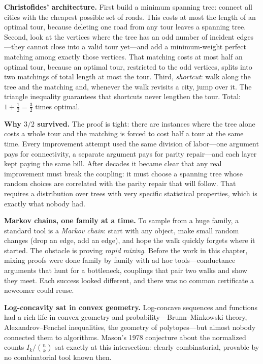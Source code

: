 \noindent\textbf{Christofides' architecture.} First build a minimum spanning tree: connect all cities with the cheapest possible set of roads. This costs at most the length of an optimal tour, because deleting one road from any tour leaves a spanning tree. Second, look at the vertices where the tree has an odd number of incident edges---they cannot close into a valid tour yet---and add a minimum-weight perfect matching among exactly those vertices. That matching costs at most half an optimal tour, because an optimal tour, restricted to the odd vertices, splits into two matchings of total length at most the tour. Third, \emph{shortcut}: walk along the tree and the matching and, whenever the walk revisits a city, jump over it. The triangle inequality guarantees that shortcuts never lengthen the tour. Total: $1+\tfrac12=\tfrac32$ times optimal.

\noindent\textbf{Why $3/2$ survived.} The proof is tight: there are instances where the tree alone costs a whole tour and the matching is forced to cost half a tour at the same time. Every improvement attempt used the same division of labor---one argument pays for connectivity, a separate argument pays for parity repair---and each layer kept paying the same bill. After decades it became clear that any real improvement must break the coupling: it must choose a spanning tree whose random choices are correlated with the parity repair that will follow. That requires a distribution over trees with very specific statistical properties, which is exactly what nobody had.

\noindent\textbf{Markov chains, one family at a time.} To sample from a huge family, a standard tool is a \emph{Markov chain}: start with any object, make small random changes (drop an edge, add an edge), and hope the walk quickly forgets where it started. The obstacle is proving \emph{rapid mixing}. Before the work in this chapter, mixing proofs were done family by family with ad hoc tools---conductance arguments that hunt for a bottleneck, couplings that pair two walks and show they meet. Each success looked different, and there was no common certificate a newcomer could reuse.

\noindent\textbf{Log-concavity sat in convex geometry.} Log-concave sequences and functions had a rich life in convex geometry and probability---Brunn--Minkowski theory, Alexandrov--Fenchel inequalities, the geometry of polytopes---but almost nobody connected them to algorithms. Mason's 1978 conjecture about the normalized counts $I_k/\binom nk$ sat exactly at this intersection: clearly combinatorial, provable by no combinatorial tool known then.

